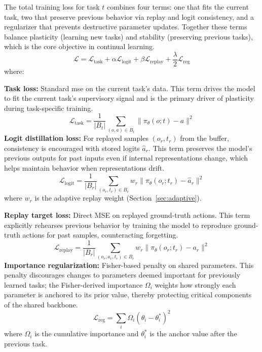 \documentclass[3p,times,procedia]{elsarticle}
\begin{document}
The total training loss for task $t$ combines four terms: one that fits the current task, two that preserve previous behavior via replay and logit consistency, and a regularizer that prevents destructive parameter updates. Together these terms balance plasticity (learning new tasks) and stability (preserving previous tasks), which is the core objective in continual learning.
\begin{equation}
    \mathcal{L} = \mathcal{L}_{\text{task}} + \alpha \mathcal{L}_{\text{logit}} + \beta \mathcal{L}_{\text{replay}} + \frac{\lambda}{2} \mathcal{L}_{\text{reg}}
    \label{eq:total_loss}
\end{equation}
where:

\textbf{Task loss:} Standard \ac{mse} on the current task's data. This term drives the model to fit the current task's supervisory signal and is the primary driver of plasticity during task-specific training.
\begin{equation}
    \mathcal{L}_{\text{task}} = \frac{1}{|B_t|}\sum_{(o,a) \in B_t} \|\pi_\theta(o; t) - a\|^2
\end{equation}
\textbf{Logit distillation loss:} For replayed samples $(o_r, t_r)$ from the buffer, consistency is encouraged with stored logits $\hat{a}_r$. This term preserves the model's previous outputs for past inputs even if internal representations change, which helps maintain behavior when representations drift.
\begin{equation}
    \mathcal{L}_{\text{logit}} = \frac{1}{|B_r|}\sum_{(o_r, t_r) \in B_r} w_r \|\pi_\theta(o_r; t_r) - \hat{a}_r\|^2
\end{equation}
where $w_r$ is the adaptive replay weight (Section~\ref{sec:adaptive}).

\textbf{Replay target loss:} Direct MSE on replayed ground-truth actions. This term explicitly rehearses previous behavior by training the model to reproduce ground-truth actions for past samples, counteracting forgetting.
\begin{equation}
    \mathcal{L}_{\text{replay}} = \frac{1}{|B_r|}\sum_{(o_r, a_r, t_r) \in B_r} w_r \|\pi_\theta(o_r; t_r) - a_r\|^2
\end{equation}
\textbf{Importance regularization:} Fisher-based penalty on shared parameters. This penalty discourages changes to parameters deemed important for previously learned tasks; the Fisher-derived importance $\Omega_i$ weights how strongly each parameter is anchored to its prior value, thereby protecting critical components of the shared backbone.
\begin{equation}
    \mathcal{L}_{\text{reg}} = \sum_{i} \Omega_i (\theta_i - \theta_i^*)^2
    \label{eq:importance_reg}
\end{equation}
where $\Omega_i$ is the cumulative importance and $\theta_i^*$ is the anchor value after the previous task.
\end{document}
